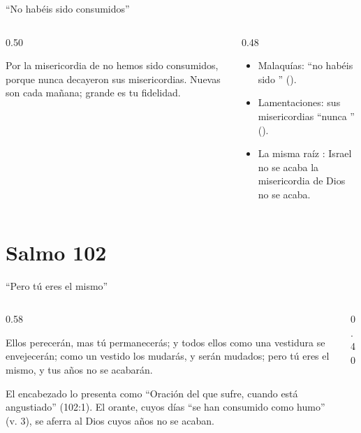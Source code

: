 \begin{frame}{``No habéis sido consumidos''}
\begin{columns}[t,onlytextwidth]
\begin{column}{0.50\textwidth}
\begin{cita}Por la misericordia de \SENOR{} no hemos sido consumidos, porque nunca decayeron sus misericordias. Nuevas son cada mañana; grande es tu fidelidad.\end{cita}
\begin{center}\end{center}
\end{column}
\begin{column}{0.48\textwidth}\small
\begin{itemize}
\item Malaquías: ``no habéis sido '' ().
\item Lamentaciones: sus misericordias ``nunca '' ().
\item La misma raíz : Israel no se acaba  la misericordia de Dios no se acaba.
\end{itemize}
\end{column}
\end{columns}
\end{frame}

\section{Salmo 102}

\begin{frame}{``Pero tú eres el mismo''}
\begin{columns}[c,onlytextwidth]
\begin{column}{0.58\textwidth}
\begin{cita}Ellos perecerán, mas tú permanecerás; y todos ellos como una vestidura se envejecerán; como un vestido los mudarás, y serán mudados; pero tú eres el mismo, y tus años no se acabarán.\end{cita}
\small El encabezado lo presenta como ``Oración del que sufre, cuando está angustiado'' (102:1). El orante, cuyos días ``se han consumido como humo'' (v. 3), se aferra al Dios cuyos años no se acaban.
\end{column}
\begin{column}{0.40\textwidth}\end{column}
\end{columns}
\end{frame}

